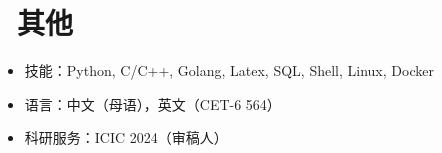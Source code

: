 \documentclass{resume}
\begin{document}

\section{\faCogs\ 其他}
\begin{itemize}[parsep=0.5ex]
  \item 技能：Python, C/C++, Golang, Latex, SQL, Shell, Linux, Docker
  \item 语言：中文（母语），英文（CET-6 564）
  \item 科研服务：ICIC 2024（审稿人）
\end{itemize}

%
%
\end{document}
